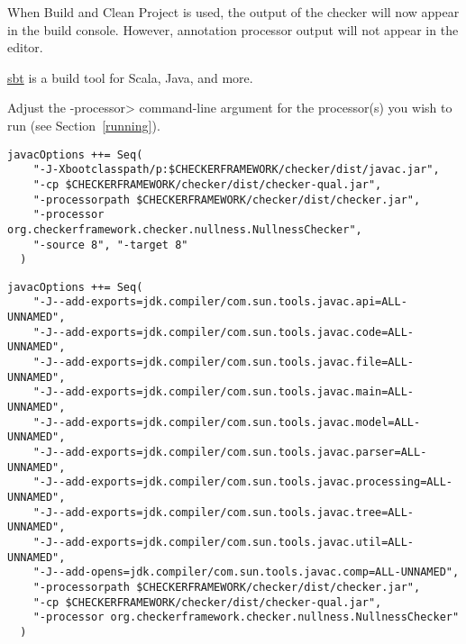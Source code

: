 \begin{enumerate}
When Build and Clean Project is used, the output of the checker will
now appear in the build console. However, annotation processor output
will not appear in the editor.

\end{enumerate}



\href{https://www.scala-sbt.org/}{sbt} is a build tool for
Scala, Java, and more.

Adjust the \<-processor> command-line argument for the processor(s)
you wish to run (see Section~\ref{running}).



\begin{Verbatim}
javacOptions ++= Seq(
    "-J-Xbootclasspath/p:$CHECKERFRAMEWORK/checker/dist/javac.jar",
    "-cp $CHECKERFRAMEWORK/checker/dist/checker-qual.jar",
    "-processorpath $CHECKERFRAMEWORK/checker/dist/checker.jar",
    "-processor org.checkerframework.checker.nullness.NullnessChecker",
    "-source 8", "-target 8"
  )
\end{Verbatim}



\begin{Verbatim}
javacOptions ++= Seq(
    "-J--add-exports=jdk.compiler/com.sun.tools.javac.api=ALL-UNNAMED",
    "-J--add-exports=jdk.compiler/com.sun.tools.javac.code=ALL-UNNAMED",
    "-J--add-exports=jdk.compiler/com.sun.tools.javac.file=ALL-UNNAMED",
    "-J--add-exports=jdk.compiler/com.sun.tools.javac.main=ALL-UNNAMED",
    "-J--add-exports=jdk.compiler/com.sun.tools.javac.model=ALL-UNNAMED",
    "-J--add-exports=jdk.compiler/com.sun.tools.javac.parser=ALL-UNNAMED",
    "-J--add-exports=jdk.compiler/com.sun.tools.javac.processing=ALL-UNNAMED",
    "-J--add-exports=jdk.compiler/com.sun.tools.javac.tree=ALL-UNNAMED",
    "-J--add-exports=jdk.compiler/com.sun.tools.javac.util=ALL-UNNAMED",
    "-J--add-opens=jdk.compiler/com.sun.tools.javac.comp=ALL-UNNAMED",
    "-processorpath $CHECKERFRAMEWORK/checker/dist/checker.jar",
    "-cp $CHECKERFRAMEWORK/checker/dist/checker-qual.jar",
    "-processor org.checkerframework.checker.nullness.NullnessChecker"
  )
\end{Verbatim}


